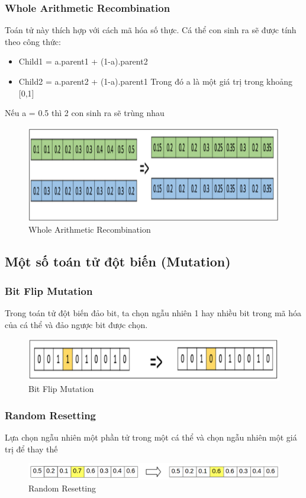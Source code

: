 \documentclass[a4paper,12pt]{report}
\begin{document}
\subsubsection{Whole Arithmetic Recombination}
Toán tử này thích hợp với cách mã hóa số thực. Cá thể con sinh ra sẽ được tính theo công thức:
\begin{itemize}
\item Child1 = a.parent1 + (1-a).parent2 
\item Child2 = a.parent2 + (1-a).parent1 
Trong đó a là một giá trị trong khoảng [0,1]
\end{itemize}
Nếu a = 0.5 thì 2 con sinh ra sẽ trùng nhau
\begin{figure}[H]
\centering 
\includegraphics[scale=0.4]{whole_arithmetic_recombination.png}
\caption{Whole Arithmetic Recombination}
\end{figure}

\subsection{Một số toán tử đột biến (Mutation)}
\subsubsection{Bit Flip Mutation}
Trong toán tử đột biến đảo bit, ta chọn ngẫu nhiên 1 hay nhiều bit trong mã hóa của cá thể và đảo ngược bit được chọn.
\begin{figure}[H]
\centering
\includegraphics[scale=0.4]{bit_flip_mutation.png}
\caption{Bit Flip Mutation}
\end{figure}
 
\subsubsection{Random Resetting}
Lựa chọn ngẫu nhiên một phần tử trong một cá thể và chọn ngẫu nhiên một giá trị để thay thế
\begin{figure}[H]
\centering
\includegraphics[scale=0.4]{random_resetting.png}
\caption{Random Resetting}
\end{figure}
\end{document}
